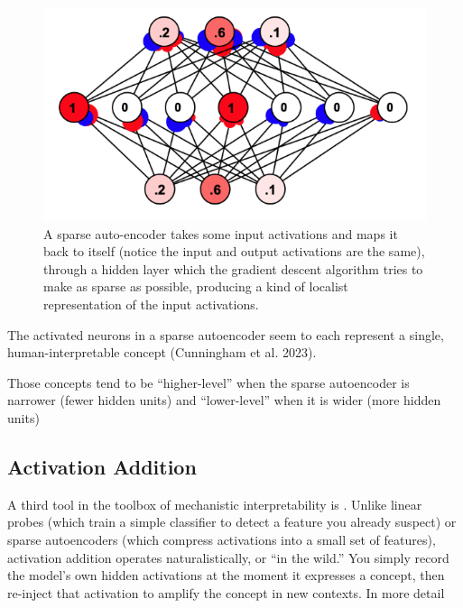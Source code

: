 \begin{figure}[ht]
\centering
\includegraphics[scale=.5]{./images/saeSimbrain.png}
\caption[Simbrain screenshot from Jeff Yoshimi.]{
      A sparse auto-encoder takes some input activations and maps it back to
      itself (notice the input and output activations are the same), through a
      hidden layer which the gradient descent algorithm tries to make as sparse
      as possible, producing a kind of localist representation of the input
      activations.
}
\label{saeSimbrain}
\end{figure}

The activated neurons in a sparse autoencoder seem to each represent a single,
human-interpretable concept (Cunningham et al. 2023). 

Those concepts tend to be ``higher-level'' when the sparse autoencoder is
narrower (fewer hidden units) and ``lower-level'' when it is wider (more hidden
units)


\subsection{Activation Addition}

A third tool in the toolbox of mechanistic interpretability is
. Unlike linear probes (which train a simple
classifier to detect a feature you already suspect) or sparse autoencoders
(which compress activations into a small set of features), activation addition
operates naturalistically, or “in the wild.” You simply record the model’s own
hidden activations at the moment it expresses a concept, then re-inject that
activation to amplify the concept in new contexts. In more detail

